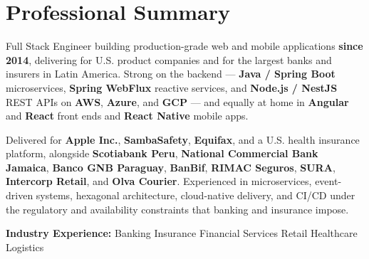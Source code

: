 
\section{Professional Summary}

Full Stack Engineer building production-grade web and mobile applications \textbf{since 2014},
delivering for U.S. product companies and for the largest banks and insurers in Latin America. Strong on the
backend --- \textbf{Java / Spring Boot} microservices, \textbf{Spring WebFlux} reactive services,
and \textbf{Node.js / NestJS} REST APIs on \textbf{AWS}, \textbf{Azure}, and \textbf{GCP} --- and
equally at home in \textbf{Angular} and \textbf{React} front ends and \textbf{React Native} mobile
apps.

\vspace{3pt}

Delivered for \textbf{Apple Inc.}, \textbf{SambaSafety}, \textbf{Equifax}, and a U.S. health
insurance platform, alongside \textbf{Scotiabank Peru}, \textbf{National Commercial Bank Jamaica},
\textbf{Banco GNB Paraguay}, \textbf{BanBif}, \textbf{RIMAC Seguros}, \textbf{SURA},
\textbf{Intercorp Retail}, and \textbf{Olva Courier}. Experienced in microservices, event-driven systems, hexagonal architecture,
cloud-native delivery, and CI/CD under the regulatory and availability constraints that banking and
insurance impose.

\vspace{3pt}

\vspace{4pt}
{\small\color{cvMuted}%
  \textbf{Industry Experience:}\enspace%
  Banking\enspace\textbar\enspace
  Insurance\enspace\textbar\enspace
  Financial Services\enspace\textbar\enspace
  Retail\enspace\textbar\enspace
  Healthcare\enspace\textbar\enspace
  Logistics%
}
